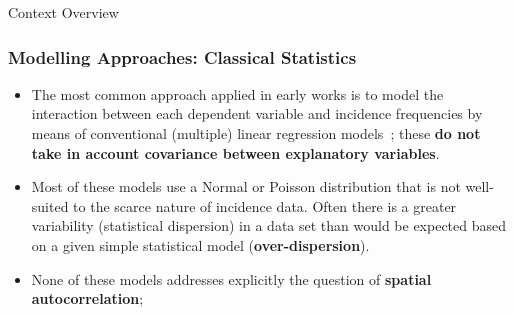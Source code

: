 \documentclass[hyperref={pdfpagelabels=true}]{beamer}
\begin{document}
\begin{frame}
\huge
{ \centering
Context Overview}
\end{frame}

\begin{frame}
\frametitle{Modelling Approaches: Classical Statistics}
\begin{itemize}
\item<1-> The most common approach applied in early works is to model the interaction between each dependent variable and incidence frequencies by means of conventional (multiple) linear regression models~\cite{bayesian}; these \textbf{do not take in account covariance between explanatory variables}. 
\item<2-> Most of these models use a Normal or Poisson distribution that is not well-suited to the scarce nature of incidence data. Often there is a greater variability (statistical dispersion) in a data set than would be expected based on a given simple statistical model (\textbf{over-dispersion}).
\item<3-> None of these models addresses explicitly the question of \textbf{spatial autocorrelation};
\end{itemize}
\end{frame}
\end{document}
